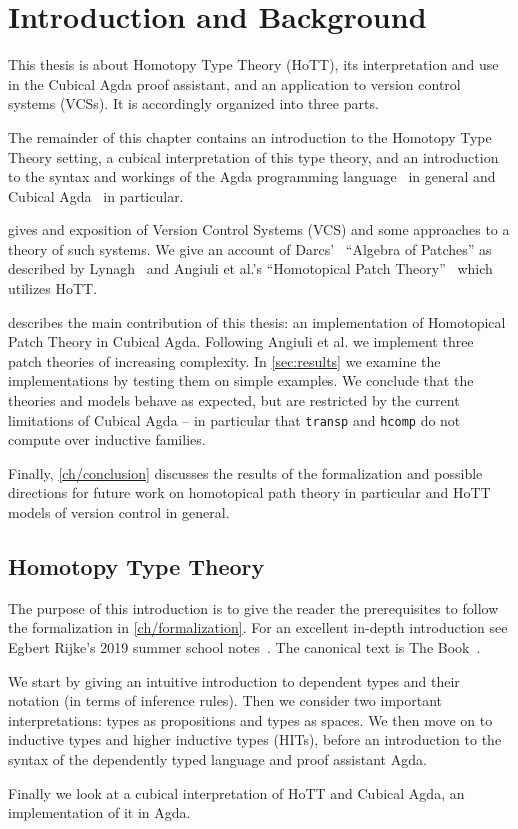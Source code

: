 \chapter{Introduction and Background}\label{ch/intro}

This thesis is about Homotopy Type Theory (HoTT), its interpretation and use in the
Cubical Agda proof assistant, and an application to version control systems (VCSs).
It is accordingly organized into three parts.

The remainder of this chapter contains an introduction to the Homotopy Type Theory
setting, a cubical interpretation of this type theory, and an introduction to
the syntax and workings of the Agda programming language~\cite{Agda} in general and Cubical
Agda~\cite{vezzosi2021cubical} in particular.

 gives and exposition of Version Control Systems (VCS) and some
approaches to a theory of such systems. We give an account of
Darcs'~\cite{Darcs} ``Algebra of Patches'' as described by
Lynagh~\cite{Lynagh2006} and Angiuli et al.'s ``Homotopical Patch
Theory''~\cite{Angiuli2016} which utilizes HoTT.

 describes the main contribution of this thesis: an
implementation of Homotopical Patch Theory in Cubical Agda. Following Angiuli et
al. we implement three patch theories of increasing complexity. In
\autoref{sec:results} we examine the implementations by testing them on simple
examples. We conclude that the theories and models behave as expected, but are
restricted by the current limitations of Cubical Agda -- in particular that
\texttt{transp} and \texttt{hcomp} do not compute over inductive families.

Finally, \autoref{ch/conclusion} discusses the results of the formalization and
possible directions for future work on homotopical path theory in particular and
HoTT models of version control in general.

\section{Homotopy Type Theory}

The purpose of this introduction is to give the reader the prerequisites to
follow the formalization in \autoref{ch/formalization}. For an excellent
in-depth introduction see Egbert Rijke's 2019 summer school
notes~\cite{Rijke2019}. The canonical text is The Book~\cite{hottbook}.

We start by giving an intuitive introduction to dependent types and their
notation (in terms of inference rules). Then we consider two important
interpretations: types as propositions and types as spaces. We then move on to
inductive types and higher inductive types (HITs), before an introduction to the
syntax of the dependently typed language and proof assistant Agda.

Finally we look at a cubical interpretation of HoTT and Cubical Agda, an
implementation of it in Agda.
